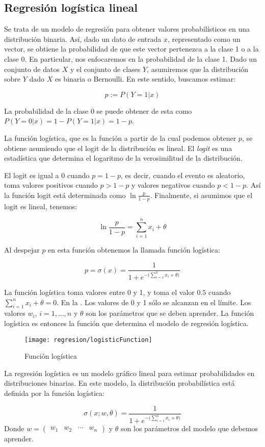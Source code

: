 \subsection{Regresión logística lineal}

Se trata de un modelo de regresión para obtener valores probabilísticos en una distribución binaria. Así, dado un dato de entrada $x$, representado como un vector, se obtiene la probabilidad de que este vector pertenezca a la clase 1 o a la clase 0. En particular, nos enfocaremos en la probabilidad de la clase 1. Dado un conjunto de datos $X$ y el conjunto de clases $Y$, asumiremos que la distribución sobre $Y$ dado $X$ es binaria o Bernoulli. En este sentido, buscamos estimar:

$$p := P(Y=1|x)$$

La probabilidad de la clase 0 se puede obtener de esta como $P(Y=0|x) = 1-P(Y=1|x) = 1-p$. {\color{gray}La función logística, que es la función a partir de la cual podemos obtener $p$, se obtiene asumiendo que el logit de la distribución es lineal. El \emph{logit} es una estadística que determina el logaritmo de la verosimilitud de la distribución.

El logit es igual a 0 cuando $ p = 1-p$, es decir, cuando el evento es aleatorio, toma valores positivos cuando $p > 1-p$ y valores negativos cuando $p < 1-p$. Así la función logit está determinada como $\ln \frac{p}{1-p}$. Finalmente, si asumimos que el logit es lineal, tenemos:}

$$\ln \frac{p}{1-p} = \sum_{i=1}^n x_i + \theta$$

Al despejar $p$ en esta función obtenemos la llamada función logística:

$$p = \sigma(x) = \frac{1}{1 + e^{-\big(\sum_{i=1}^n x_i + \theta\big)}} $$

La función logística toma valores entre 0 y 1, y toma el valor $0.5$ cuando $\sum_{i=1}^n x_i + \theta = 0$. En la . Los valores de 0 y 1 sólo se alcanzan en el límite. Los valores $w_i$, $i=1,...,n$ y $\theta$ son los parámetros que se deben aprender. La función logística es entonces la función que determina el modelo de regresión logística.


\begin{figure}
 \centering
 \texttt{[image: regresion/logisticFunction]}
 \caption{Función logística}\label{Fig:Logistic}
\end{figure}




\begin{definition}
La regresión logística es un modelo gráfico lineal para estimar probabilidades en distribuciones binarias. En este modelo, la distribución probabilística está definida por la función logística:

$$ \sigma(x; w, \theta) = \frac{1}{1 + e^{-\big(\sum_{i=1}^n x_i + \theta\big)}} $$
Donde $w = \begin{pmatrix} w_1 & w_2 & \cdots & w_n \end{pmatrix}$ y $\theta$ son los parámetros del modelo que debemos aprender.
\end{definition}

